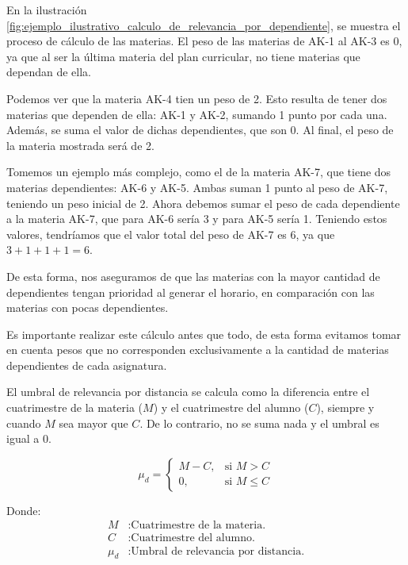 En la ilustración \ref{fig:ejemplo_ilustrativo_calculo_de_relevancia_por_dependiente}, se muestra el proceso de cálculo de las materias. El peso de las materias de AK-1 al AK-3 es 0, ya que al ser la última materia del plan curricular, no tiene materias que dependan de ella.

Podemos ver que la materia AK-4 tien un peso de 2. Esto resulta de tener dos materias que dependen de ella: AK-1 y AK-2, sumando 1 punto por cada una. Además, se suma el valor de dichas dependientes, que son 0. Al final, el peso de la materia mostrada será de 2.

Tomemos un ejemplo más complejo, como el de la materia AK-7, que tiene dos materias dependientes: AK-6 y AK-5. Ambas suman 1 punto al peso de AK-7, teniendo un peso inicial de 2. Ahora debemos sumar el peso de cada dependiente a la materia AK-7, que para AK-6 sería 3 y para AK-5 sería 1. Teniendo estos valores, tendríamos que el valor total del peso de AK-7 es 6, ya que $3+1+1+1 = 6$.

De esta forma, nos aseguramos de que las materias con la mayor cantidad de dependientes tengan prioridad al generar el horario, en comparación con las materias con pocas dependientes.

Es importante realizar este cálculo antes que todo, de esta forma evitamos tomar en cuenta pesos que no corresponden exclusivamente a la cantidad de materias dependientes de cada asignatura.

El umbral de relevancia por distancia se calcula como la diferencia entre el cuatrimestre de la materia ($M$) y el cuatrimestre del alumno ($C$), siempre y cuando $M$ sea mayor que $C$. De lo contrario, no se suma nada y el umbral es igual a $0$.

\begin{equation}
    \mu_d = \begin{cases} M - C, & \text{si } M > C \\ 0, & \text{si } M \leq C \end{cases}
    \label{eq:umbral_distancia}
\end{equation}

Donde:
\begin{align*}
    M & : \text{Cuatrimestre de la materia.} \\
    C & : \text{Cuatrimestre del alumno.} \\
    \mu_d & : \text{Umbral de relevancia por distancia.}
\end{align*}

